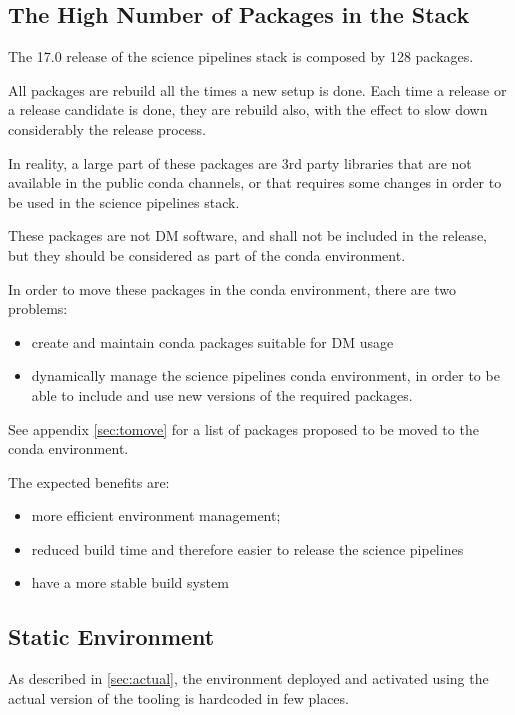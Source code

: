 \subsection{The High Number of Packages in the Stack} \label{sec:high}

The 17.0 release of the science pipelines stack is composed by 128 packages.

All packages are rebuild all the times a new setup is done. 
Each time a release or a release candidate is done, they are rebuild also, with the effect to slow down considerably the release process.

In reality, a large part of these packages are 3rd party libraries that are not available in the public conda channels, or that requires some changes in order to be used in the science pipelines stack.

These packages are not DM software, and shall not be included in the release, but  they should be considered as part of the conda environment.

In order to move these packages in the conda environment, there are two problems:

\begin{itemize}
\item create and maintain conda packages suitable for DM usage
\item dynamically manage the science pipelines conda environment, in order to be able to include and use new versions of the required packages.
\end{itemize}

See appendix \ref{sec:tomove} for a list of packages proposed to be moved to the conda environment.

The expected benefits are:

\begin{itemize}
\item more efficient environment management;
\item reduced build time and therefore easier to release the science pipelines
\item have a more stable build system
\end{itemize}


\subsection{Static Environment} \label{sec:static}

As described in \ref{sec:actual}, the environment deployed and activated using the actual version of the tooling is hardcoded in few places.

